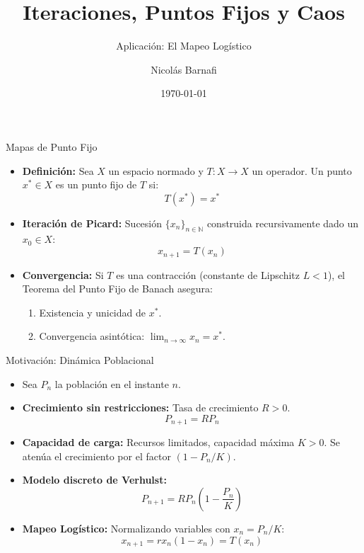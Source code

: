 \documentclass[12pt,aspectratio=169,xcolor=dvipsnames]{beamer}
\title{Iteraciones, Puntos Fijos y Caos}
\subtitle{Aplicación: El Mapeo Logístico}
\author{Nicolás Barnafi}
\institute{Pontificia Universidad Católica de Chile \\ IMT1001 - Introducción a la Ingeniería Matemática}
\date{\today}
\begin{document}
\begin{frame}
    \titlepage
\end{frame}

\begin{frame}{Mapas de Punto Fijo}
    \begin{itemize}
        \item \textbf{Definición:} Sea $X$ un espacio normado y $T: X \to X$ un operador. Un punto $x^* \in X$ es un punto fijo de $T$ si:
        $$T(x^*) = x^*$$
        
        \item \textbf{Iteración de Picard:} Sucesión $\{x_n\}_{n \in \mathbb{N}}$ construida recursivamente dado un $x_0 \in X$:
        $$x_{n+1} = T(x_n)$$
        
        \item \textbf{Convergencia:} Si $T$ es una contracción (constante de Lipschitz $L < 1$), el Teorema del Punto Fijo de Banach asegura:
        \begin{enumerate}
            \item Existencia y unicidad de $x^*$.
            \item Convergencia asintótica: $\lim_{n \to \infty} x_n = x^*$.
        \end{enumerate}
    \end{itemize}
\end{frame}

\begin{frame}{Motivación: Dinámica Poblacional}
    \begin{itemize}
        \item Sea $P_n$ la población en el instante $n$.
        \item \textbf{Crecimiento sin restricciones:} Tasa de crecimiento $R > 0$.
        $$P_{n+1} = R P_n$$
        
        \item \textbf{Capacidad de carga:} Recursos limitados, capacidad máxima $K > 0$. Se atenúa el crecimiento por el factor $(1 - P_n / K)$.
        
        \item \textbf{Modelo discreto de Verhulst:}
        $$P_{n+1} = R P_n \left(1 - \frac{P_n}{K}\right)$$
        
        \item \textbf{Mapeo Logístico:} Normalizando variables con $x_n = P_n / K$:
        $$x_{n+1} = r x_n (1 - x_n) = T(x_n)$$
    \end{itemize}
\end{frame}
\end{document}

